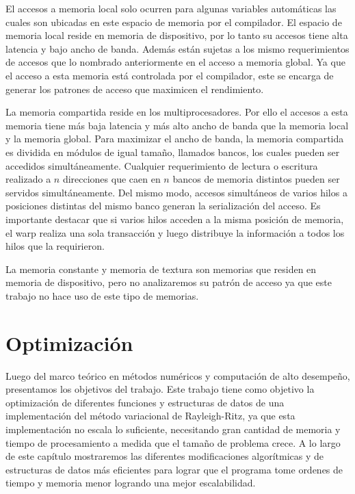 \documentclass[a4paper,openright,12pt, oneside]{book}
\begin{document}
El accesos a memoria local solo ocurren para algunas variables autom\'aticas las cuales
son ubicadas en este espacio de memoria por el compilador. El espacio de memoria local
reside en memoria de dispositivo, por lo tanto su accesos tiene alta latencia y bajo
ancho de banda. Adem\'as est\'an sujetas a los mismo requerimientos de accesos que lo
nombrado anteriormente en el acceso a memoria global. Ya que el acceso a esta memoria
est\'a controlada por el compilador, este se encarga de generar los patrones de acceso
que maximicen el rendimiento.

La memoria compartida reside en los multiprocesadores. Por ello el accesos a esta memoria
tiene m\'as baja latencia y m\'as alto ancho de banda que la memoria local y la memoria global.
Para maximizar el ancho de banda, la memoria compartida es dividida en m\'odulos de
igual tama\~no, llamados bancos, los cuales pueden ser accedidos simult\'aneamente. Cualquier
requerimiento de lectura o escritura realizado a $n$ direcciones que caen en $n$ bancos
de memoria distintos pueden ser servidos simult\'aneamente. Del mismo modo, accesos simult\'aneos
de varios hilos a posiciones distintas del mismo banco generan la serializaci\'on del acceso.
Es importante destacar que si varios hilos acceden a la misma posici\'on de memoria, el
warp realiza una sola transacci\'on y luego distribuye la informaci\'on a todos los
hilos que la requirieron.

La memoria constante y memoria de textura son memorias que residen en memoria de
dispositivo, pero no analizaremos su patr\'on de acceso ya que este trabajo no hace
uso de este tipo de memorias.


\setcounter{chapter}{4}
\setcounter{section}{0}
\chapter*{Optimizaci\'on}\label{Optimizacion}
\markboth{}{} %

Luego del marco te\'orico en m\'etodos num\'ericos y computaci\'on de alto desempe\~no, presentamos los objetivos del trabajo.
Este trabajo tiene como objetivo la optimizaci\'on de diferentes funciones y estructuras de datos de una implementaci\'on del m\'etodo variacional de Rayleigh-Ritz, ya que esta implementaci\'on no escala lo suficiente, necesitando gran cantidad de memoria y tiempo de procesamiento a medida que el tama\~no de problema crece.
A lo largo de este cap\'itulo mostraremos las diferentes modificaciones algor\'itmicas y de estructuras de datos m\'as eficientes para lograr que el programa tome ordenes de tiempo y memoria menor logrando una mejor escalabilidad.
\end{document}
